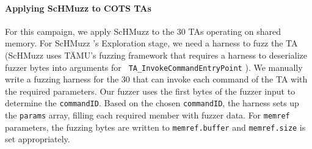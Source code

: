 \documentclass[conference]{IEEEtran} %
\newcommand{\sysname}{ScHMuzz\xspace}
\newcommand{\stageone}{Exploration\xspace}
\newcommand{\numTAsharnessed}{30\xspace}
\providecommand{\DIFaddtex}[1]{{\protect\color{blue} \sf #1}} %
\providecommand{\DIFaddbegin}{} %
\providecommand{\DIFaddend}{} %
\providecommand{\DIFdelbegin}{} %
\providecommand{\DIFadd}[1]{\texorpdfstring{\DIFaddtex{#1}}{#1}} %
\begin{document}

\paragraph{\DIFadd{Applying }\sysname \DIFadd{to COTS TAs}}
\DIFadd{For this campaign, we apply }\sysname \DIFadd{to the }\numTAsharnessed \DIFadd{TAs operating 
on shared memory. 
For }\sysname\DIFadd{'s }\stageone \DIFadd{stage, we need a harness to fuzz the TA (}\sysname \DIFadd{uses TÄMU's 
fuzzing framework that requires a harness to deserialize fuzzer bytes into arguments for 
}\texttt{\DIFadd{TA\_InvokeCommandEntryPoint}}\DIFadd{). 
We }\DIFaddend manually write a fuzzing harness \DIFaddbegin \DIFadd{for the }\numTAsharnessed \DIFaddend that can invoke each command 
of the TA with the required parameters.
Our fuzzer uses the first bytes of the fuzzer input to determine the \texttt{commandID}. 
Based on the chosen \texttt{commandID}, the harness sets up the \texttt{params} array, 
filling each required member with fuzzer data. For \texttt{memref} parameters, the fuzzing 
bytes are written to \texttt{memref.buffer} and \texttt{memref.size} is set appropriately.
\DIFdelbegin %
\end{document}

